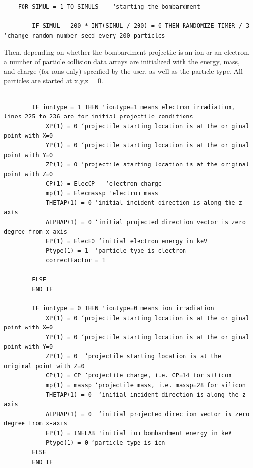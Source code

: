 \documentclass[10pt, reqno]{exam}
\begin{document}
\begin{verbatim}


    FOR SIMUL = 1 TO SIMULS    ‘starting the bombardment 
    
        IF SIMUL - 200 * INT(SIMUL / 200) = 0 THEN RANDOMIZE TIMER / 3  ‘change random number seed every 200 particles
\end{verbatim}
Then, depending on whether the bombardment projectile is an ion or an electron, a number of particle collision data arrays are initialized with the energy, mass, and charge (for ions only) specified by the user, as well as the particle type. All particles are started at x,y,z = 0. \par
\begin{verbatim}
    
        IF iontype = 1 THEN 'iontype=1 means electron irradiation, lines 225 to 236 are for initial projectile conditions
            XP(1) = 0 ‘projectile starting location is at the original point with X=0
            YP(1) = 0 ‘projectile starting location is at the original point with Y=0
            ZP(1) = 0 'projectile starting location is at the original point with Z=0
            CP(1) = ElecCP   ‘electron charge
            mp(1) = Elecmassp 'electron mass
            THETAP(1) = 0 ‘initial incident direction is along the z axis
            ALPHAP(1) = 0 ‘initial projected direction vector is zero degree from x-axis
            EP(1) = ElecE0 ‘initial electron energy in keV
            Ptype(1) = 1  ‘particle type is electron
            correctFactor = 1  
    
        ELSE
        END IF
    
        IF iontype = 0 THEN 'iontype=0 means ion irradiation
            XP(1) = 0 ‘projectile starting location is at the original point with X=0
            YP(1) = 0 ‘projectile starting location is at the original point with Y=0
            ZP(1) = 0  ‘projectile starting location is at the original point with Z=0
            CP(1) = CP ‘projectile charge, i.e. CP=14 for silicon 
            mp(1) = massp ‘projectile mass, i.e. massp=28 for silicon
            THETAP(1) = 0  ‘initial incident direction is along the z axis
            ALPHAP(1) = 0  ‘initial projected direction vector is zero degree from x-axis
            EP(1) = INELAB 'initial ion bombardment energy in keV
            Ptype(1) = 0 ‘particle type is ion
        ELSE
        END IF
\end{verbatim}
\end{document}
